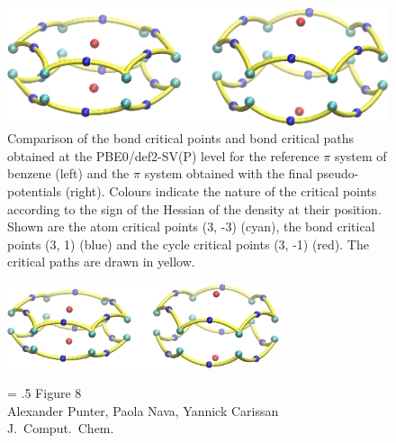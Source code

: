 \documentclass[12pt]{article}
\begin{document}
\begin{figure}
\begin{center}
\includegraphics[width=12cm]{aim_c6h6.eps}
\end{center}
\vspace{0.25in}
\hspace*{3in}
\caption{Comparison of the bond critical points and bond critical paths obtained at the PBE0/def2-SV(P)
level for the
reference $\pi$ system of benzene (left) and the $\pi$ system obtained with the final pseudo-potentials (right). Colours indicate the nature of the critical points according to the sign of the Hessian
of the density at their position. Shown are the atom critical points (3, -3) (cyan), the bond critical points (3, 1) (blue) and the cycle critical points (3, -1) (red). The critical paths are drawn in yellow.}
\label{fig:aim_c6h6}
\end{figure}

\clearpage

\begin{figure}
\begin{center}
\includegraphics[width=8cm]{aim_c6h6.eps}
\end{center}
{\Large
\begin{minipage}[t]{3in}
\baselineskip = .5\baselineskip
Figure 8 \\
Alexander Punter, Paola Nava, Yannick Carissan\\
J.\ Comput.\ Chem.
\end{minipage}
}
\end{figure}

\clearpage
\end{document}
